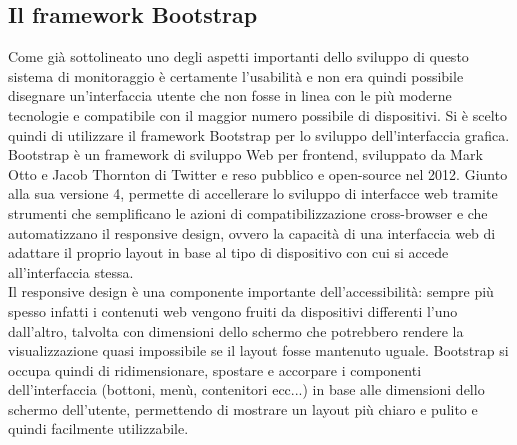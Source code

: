 \subsection{Il framework Bootstrap}
Come già sottolineato uno degli aspetti importanti dello sviluppo di questo sistema di monitoraggio è certamente l'usabilità e non era quindi possibile disegnare un'interfaccia utente che non fosse in linea con le più moderne tecnologie e compatibile con il maggior numero possibile di dispositivi. Si è scelto quindi di utilizzare il framework Bootstrap per lo sviluppo dell'interfaccia grafica. Bootstrap è un framework di sviluppo Web per frontend, sviluppato da Mark Otto e Jacob Thornton di Twitter e reso pubblico e open-source nel 2012. Giunto alla sua versione 4, permette di accellerare lo sviluppo di interfacce web tramite strumenti che semplificano le azioni di compatibilizzazione cross-browser e che automatizzano il responsive design, ovvero la capacità di una interfaccia web di adattare il proprio layout in base al tipo di dispositivo con cui si accede all'interfaccia stessa.
\\Il responsive design è una componente importante dell'accessibilità: sempre più spesso infatti i contenuti web vengono fruiti da dispositivi differenti l'uno dall'altro, talvolta con dimensioni dello schermo che potrebbero rendere la visualizzazione quasi impossibile se il layout fosse mantenuto uguale. Bootstrap si occupa quindi di ridimensionare, spostare e accorpare i componenti dell'interfaccia (bottoni, menù, contenitori ecc...) in base alle dimensioni dello schermo dell'utente, permettendo di mostrare un layout più chiaro e pulito e quindi facilmente utilizzabile.
